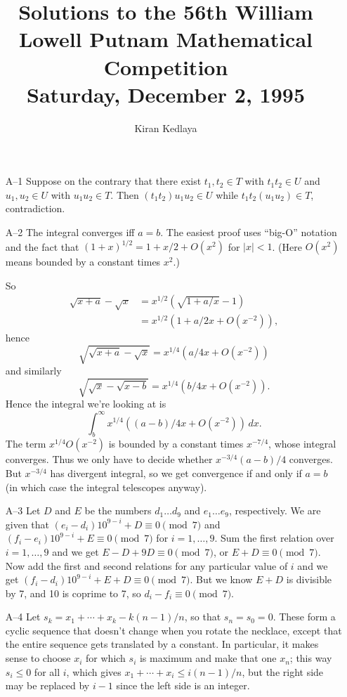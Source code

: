 \documentclass[amssymb,twocolumn,pra,10pt,aps]{revtex4-1}
\begin{document}
\title{Solutions to the 56th William Lowell Putnam Mathematical Competition \\
    Saturday, December 2, 1995}
\author{Kiran Kedlaya}
\noaffiliation
\maketitle

\begin{itemize}
\item[A--1]
Suppose on the contrary that there exist $t_{1}, t_{2} \in T$
with $t_{1}t_{2} \in U$ and $u_{1}, u_{2} \in U$ with $u_{1}u_{2} \in
T$. Then $(t_{1}t_{2})u_{1}u_{2} \in U$ while
$t_{1}t_{2}(u_{1}u_{2}) \in T$, contradiction.

\item[A--2]
The integral converges iff $a=b$. The easiest proof uses
``big-O'' notation and the fact that $(1+x)^{1/2} = 1 + x/2 +
O(x^{2})$ for $|x|<1$. (Here $O(x^{2})$ means bounded by a constant
times $x^{2}$.)

So
\begin{align*}
\sqrt{x+a}-\sqrt{x} &= x^{1/2}(\sqrt{1+a/x} - 1) \\
&= x^{1/2}(1 + a/2x + O(x^{-2})),
\end{align*}
hence
\[
\sqrt{\sqrt{x+a} - \sqrt{x}} = x^{1/4} (a/4x + O(x^{-2}))
\]
and similarly
\[
\sqrt{\sqrt{x} - \sqrt{x-b}} = x^{1/4} (b/4x + O(x^{-2})).
\]
Hence the integral we're looking at is
\[
\int_{b}^{\infty} x^{1/4} ((a-b)/4x + O(x^{-2}))\,dx.
\]
The term $x^{1/4} O(x^{-2})$ is bounded by a constant times
$x^{-7/4}$, whose integral converges. Thus we only have to decide
whether $x^{-3/4} (a-b)/4$ converges. But $x^{-3/4}$ has divergent
integral, so we get convergence if and only if $a=b$ (in which case
the integral telescopes anyway).

\item[A--3]
Let $D$ and $E$ be the numbers $d_{1}\dots d_{9}$ and $e_{1}\dots
e_{9}$, respectively. We are given that $(e_{i} - d_{i})10^{9-i} + D
\equiv 0 \pmod 7$ and $(f_{i} - e_{i})10^{9-i} + E \equiv 0 \pmod 7$
for $i=1, \dots, 9$. Sum the first relation over $i=1,\dots,9$ and we
get $E - D + 9D \equiv 0 \pmod 7$, or $E + D \equiv 0 \pmod 7$. Now
add the first and second relations for any particular value of $i$
and we get $(f_{i} - d_{i})10^{9-i} + E + D \equiv 0 \pmod 7$. But we
know $E+D$ is divisible by 7, and 10 is coprime to 7, so $d_{i} -
f_{i} \equiv 0 \pmod 7$.

\item[A--4]
Let $s_{k} = x_{1} + \cdots + x_{k} - k(n-1)/n$, so that $s_{n} =
s_{0} = 0$. These form a cyclic sequence that doesn't change when you
rotate the necklace, except that the entire sequence gets translated
by a constant. In particular, it makes sense to choose $x_{i}$ for
which $s_{i}$ is maximum and make that one $x_{n}$; this way $s_{i}
\leq 0$ for all $i$, which gives $x_{1} + \cdots + x_{i} \leq
i(n-1)/n$, but the right side may be replaced by $i-1$ since the left
side is an integer.


\end{itemize}
\end{document}
